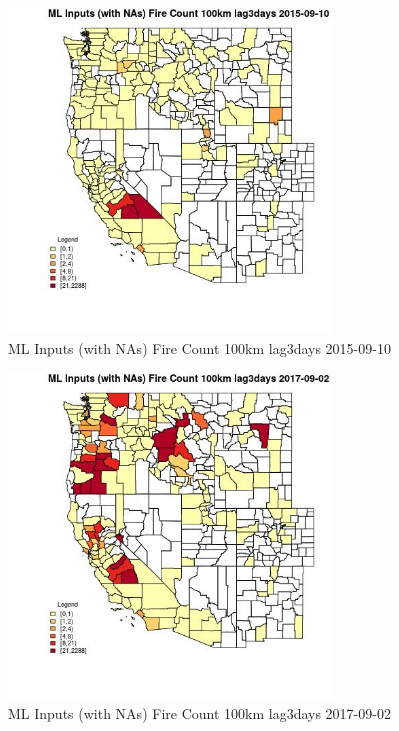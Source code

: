 \begin{figure} 
\centering  
\includegraphics[width=0.77\textwidth]{Code_Outputs/Report_ML_input_PM25_Step4_part_e_de_duplicated_aves_compiled_2019-05-21wNAs_CountyFire_Count_100km_lag3daysMean2015-09-10.jpg} 
\caption{\label{fig:Report_ML_input_PM25_Step4_part_e_de_duplicated_aves_compiled_2019-05-21wNAsCountyFire_Count_100km_lag3daysMean2015-09-10}ML Inputs (with NAs) Fire Count 100km lag3days 2015-09-10} 
\end{figure} 
 

\begin{figure} 
\centering  
\includegraphics[width=0.77\textwidth]{Code_Outputs/Report_ML_input_PM25_Step4_part_e_de_duplicated_aves_compiled_2019-05-21wNAs_CountyFire_Count_100km_lag3daysMean2017-09-02.jpg} 
\caption{\label{fig:Report_ML_input_PM25_Step4_part_e_de_duplicated_aves_compiled_2019-05-21wNAsCountyFire_Count_100km_lag3daysMean2017-09-02}ML Inputs (with NAs) Fire Count 100km lag3days 2017-09-02} 
\end{figure} 
 

